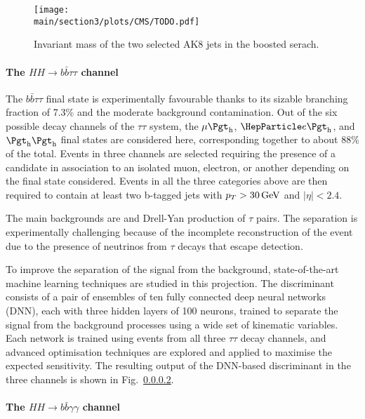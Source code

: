 \begin{figure}[!htb]
\centering 
\texttt{[image: \\main/section3/plots/CMS/TODO.pdf]}
\caption{Invariant mass of the two selected AK8 jets in the boosted \bbbb \HH serach. } 
\label{sec3:CMSHH:fig:bbbb_boosted} 
\end{figure}



\paragraph{The $HH \rightarrow b\bar{b}\tau\tau$ channel}

The $b\bar{b}\tau\tau$ final state is experimentally favourable thanks to its sizable branching fraction of 7.3\% and the moderate background contamination.
Out of the six possible decay channels of the $\tau\tau$ system, the $\mu\tauh$, $\Pe\tauh$, and $\tauh\tauh$ final states are considered here, corresponding together to about 88\% of the total.
Events in three channels are selected requiring the presence of a \tauh candidate in association to an isolated muon, electron, or another \tauh depending on the final state considered.
Events in all the three categories above are then required to contain at least two b-tagged jets with $p_{T} > 30\,\text{Ge\hspace{-.08em}V}$ and $|\eta| < 2.4$. 

The main backgrounds are \ttbar and Drell-Yan production of $\tau$ pairs.
The separation is experimentally challenging because of the incomplete reconstruction of the event due to the presence of neutrinos from $\tau$ decays that escape detection.

To improve the separation of the signal from the background, state-of-the-art machine learning techniques are studied in this projection.
The discriminant consists of a pair of ensembles of ten fully connected deep neural networks (DNN), each with three hidden layers of 100 neurons, trained to separate the \HH signal from the background processes using a wide set of kinematic variables.
Each network is trained using events from all three $\tau\tau$ decay channels, and advanced optimisation techniques are explored and applied to maximise the expected sensitivity.
The resulting output of the DNN-based discriminant in the three channels is shown in Fig.~\ref{}. 

\paragraph{The $HH \rightarrow b\bar{b}\gamma\gamma$ channel}

